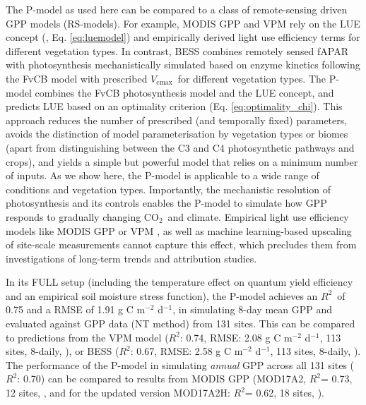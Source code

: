 \documentclass{myreport}
\newcommand{\coo}{CO$_2$}
\newcommand{\vcmax}{$V_{\text{cmax}}$}
\newcommand{\rsq}{$R^2$}
\begin{document}
The P-model as used here can be compared to a class of remote-sensing driven GPP models (RS-models). For example, MODIS GPP \citep{running04} and VPM \citep{Zhang2017-yr} rely on the LUE concept (\cite{monteith72}, Eq. \ref{eq:luemodel}) and empirically derived light use efficiency terms for different vegetation types. In contrast, BESS \citep{jiang16rse} combines remotely sensed fAPAR with photosynthesis mechanistically simulated based on enzyme kinetics following the FvCB model with prescribed \vcmax\ for different vegetation types. The P-model combines the FvCB photosynthesis model and the LUE concept, and predicts LUE based on an optimality criterion (Eq. \ref{eq:optimality_chi}). This approach reduces the number of prescribed (and temporally fixed) parameters, avoids the distinction of model parameterisation by vegetation types or biomes (apart from distinguishing between the C3 and C4 photosynthetic pathways and crops), and yields a simple but powerful model that relies on a minimum number of inputs. As we show here, the P-model is applicable to a wide range of conditions and vegetation types. Importantly, the mechanistic resolution of photosynthesis and its controls enables the P-model to simulate how GPP responds to gradually changing \coo\ and climate. Empirical light use efficiency models like MODIS GPP \citep{running04} or VPM \citep{Zhang2017-yr}, as well as machine learning-based upscaling of site-scale measurements \citep{jung11jgr, tramontana16bg} cannot capture this effect, which precludes them from investigations of long-term trends and attribution studies.

In its FULL setup (including the temperature effect on quantum yield efficiency and an empirical soil moisture stress function), the P-model achieves an \rsq\ of 0.75 and a RMSE of 1.91 g C m$^{-2}$ d$^{-1}$, in simulating 8-day mean GPP and evaluated against GPP data (NT method) from 131 sites. This can be compared to predictions from the VPM model (\rsq : 0.74, RMSE: 2.08 g C m$^{-2}$ d$^{-1}$, 113 sites, 8-daily, \cite{Zhang2017-yr}), or BESS (\rsq : 0.67, RMSE: 2.58 g C m$^{-2}$ d$^{-1}$, 113 sites, 8-daily, \cite{jiang16rse}). The performance of the P-model in simulating \textit{annual} GPP across all 131 sites (\rsq : 0.70) can be compared to results from MODIS GPP (MOD17A2, \rsq = 0.73, 12 sites, \cite{heinsch06}, and for the updated version MOD17A2H: \rsq = 0.62, 18 sites, \cite{wang17rs}). 
\end{document}
